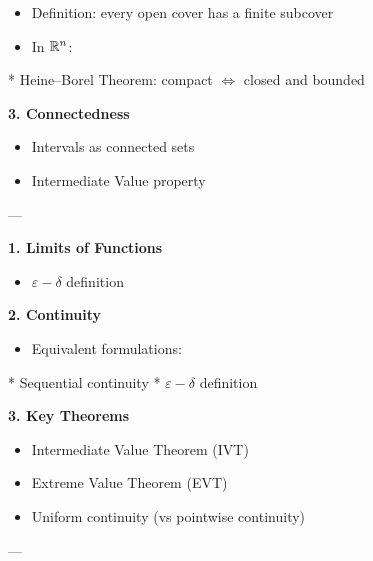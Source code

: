 \documentclass[12pt,a4paper]{report}
\begin{document}
\begin{description}
\begin{description}
		\begin{itemize}
        \item Definition: every open cover has a finite subcover
        \item In $\mathbb{R}^n$:
		\end{itemize}

  * Heine–Borel Theorem: compact $\iff$ closed and bounded

    \item \textbf{3. Connectedness}

		\begin{itemize}
        \item Intervals as connected sets
        \item Intermediate Value property
		\end{itemize}

	\end{description}
---

\item {}

	\begin{description}
    \item \textbf{1. Limits of Functions}

		\begin{itemize}
        \item $\varepsilon-\delta$ definition
		\end{itemize}

    \item \textbf{2. Continuity}

		\begin{itemize}
        \item Equivalent formulations:
		\end{itemize}

  * Sequential continuity
  * $\varepsilon-\delta$ definition

    \item \textbf{3. Key Theorems}

		\begin{itemize}
        \item Intermediate Value Theorem (IVT)
        \item Extreme Value Theorem (EVT)
        \item Uniform continuity (vs pointwise continuity)
		\end{itemize}

	\end{description}
---


\end{description}
\end{document}
